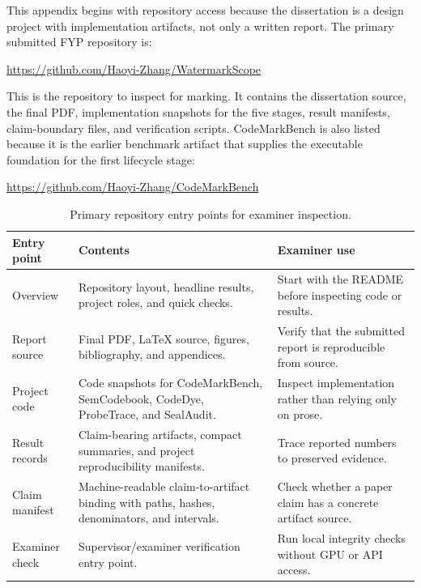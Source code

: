 
This appendix begins with repository access because the dissertation is a design project with implementation artifacts, not only a written report. The primary submitted FYP repository is:

\begin{center}
\href{https://github.com/Haoyi-Zhang/WatermarkScope}{\textnormal{https://github.com/Haoyi-Zhang/WatermarkScope}}
\end{center}

This is the repository to inspect for marking. It contains the dissertation source, the final PDF, implementation snapshots for the five stages, result manifests, claim-boundary files, and verification scripts. CodeMarkBench is also listed because it is the earlier benchmark artifact that supplies the executable foundation for the first lifecycle stage:

\begin{center}
\href{https://github.com/Haoyi-Zhang/CodeMarkBench}{\textnormal{https://github.com/Haoyi-Zhang/CodeMarkBench}}
\end{center}

\begin{table}[htbp]
\centering
\caption{Primary repository entry points for examiner inspection.}
\label{tab:repository-entry-points}
\lookuptable
\begin{tabularx}{\textwidth}{@{}L{2.35cm}YY@{}}
\toprule
Entry point & Contents & Examiner use \\
\midrule
Overview & Repository layout, headline results, project roles, and quick checks. & Start with the README before inspecting code or results. \\
Report source & Final PDF, LaTeX source, figures, bibliography, and appendices. & Verify that the submitted report is reproducible from source. \\
Project code & Code snapshots for CodeMarkBench, SemCodebook, CodeDye, ProbeTrace, and SealAudit. & Inspect implementation rather than relying only on prose. \\
Result records & Claim-bearing artifacts, compact summaries, and project reproducibility manifests. & Trace reported numbers to preserved evidence. \\
Claim manifest & Machine-readable claim-to-artifact binding with paths, hashes, denominators, and intervals. & Check whether a paper claim has a concrete artifact source. \\
Examiner check & Supervisor/examiner verification entry point. & Run local integrity checks without GPU or API access. \\
\bottomrule
\end{tabularx}
\end{table}

